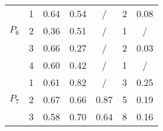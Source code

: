 \documentclass[11pt]{article}
\begin{document}
\begin{table}
\begin{tabular}{cc|c|c|c||c|c|}
\multicolumn{1}{|c|}{\multirow{3}{*}{$P_6$}} & 1 
 & \multicolumn{1}{||c|}{0.64} & 0.54 & / & 2 & 0.08 \\ \cline{2-7} 
\multicolumn{1}{|c|}{} & 2
 & \multicolumn{1}{||c|}{0.36} & 0.51 & / & 1 & / \\ \cline{2-7} 
\multicolumn{1}{|c|}{} & 3
 & \multicolumn{1}{||c|}{0.66} & 0.27 & / & 2 & 0.03 \\ \cline{2-7} 
\multicolumn{1}{|c|}{} & 4
 & \multicolumn{1}{||c|}{0.60} & 0.42 & / & 1 & / \\ \hline \hline

\multicolumn{1}{|c|}{\multirow{3}{*}{$P_7$}} & 1 
 & \multicolumn{1}{||c|}{0.61} & 0.82 & / & 3 & 0.25 \\ \cline{2-7} 
\multicolumn{1}{|c|}{} & 2
 & \multicolumn{1}{||c|}{0.67} & 0.66 & 0.87 & 5 & 0.19 \\ \cline{2-7} 
\multicolumn{1}{|c|}{} & 3
 & \multicolumn{1}{||c|}{0.58} & 0.70 & 0.64 & 8 & 0.16 \\ \hline

\end{tabular}
\end{table}
\end{document}
